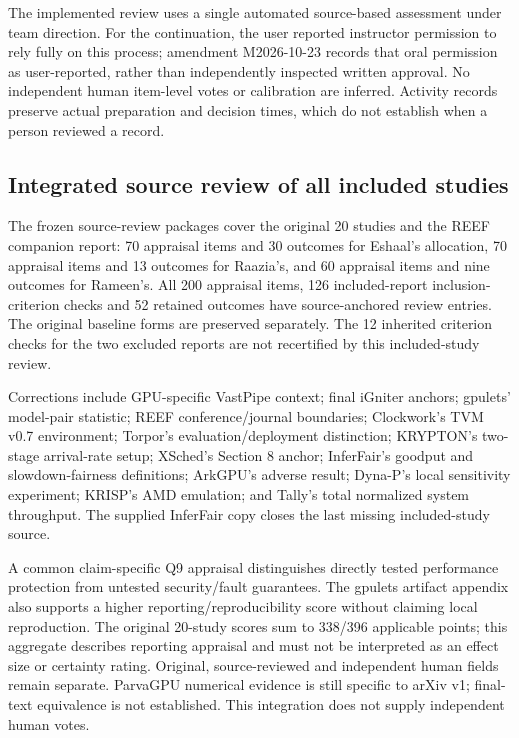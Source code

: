 The implemented review uses a single automated source-based assessment under team direction. For the continuation, the user reported instructor permission to rely fully on this process; amendment M2026-10-23 records that oral permission as user-reported, rather than independently inspected written approval. No independent human item-level votes or calibration are inferred. Activity records preserve actual preparation and decision times, which do not establish when a person reviewed a record.

\subsection{Integrated source review of all included studies}
The frozen source-review packages cover the original 20 studies and the REEF companion report: 70 appraisal items and 30 outcomes for Eshaal's allocation, 70 appraisal items and 13 outcomes for Raazia's, and 60 appraisal items and nine outcomes for Rameen's. All 200 appraisal items, 126 included-report inclusion-criterion checks and 52 retained outcomes have source-anchored review entries. The original baseline forms are preserved separately. The 12 inherited criterion checks for the two excluded reports are not recertified by this included-study review.

Corrections include GPU-specific VastPipe context; final iGniter anchors; gpulets' model-pair statistic; REEF conference/journal boundaries; Clockwork's TVM v0.7 environment; Torpor's evaluation/deployment distinction; KRYPTON's two-stage arrival-rate setup; XSched's Section 8 anchor; InferFair's goodput and slowdown-fairness definitions; ArkGPU's adverse result; Dyna-P's local sensitivity experiment; KRISP's AMD emulation; and Tally's total normalized system throughput. The supplied InferFair copy closes the last missing included-study source.

A common claim-specific Q9 appraisal distinguishes directly tested performance protection from untested security/fault guarantees. The gpulets artifact appendix also supports a higher reporting/reproducibility score without claiming local reproduction. The original 20-study scores sum to 338/396 applicable points; this aggregate describes reporting appraisal and must not be interpreted as an effect size or certainty rating. Original, source-reviewed and independent human fields remain separate. ParvaGPU numerical evidence is still specific to arXiv v1; final-text equivalence is not established. This integration does not supply independent human votes.


